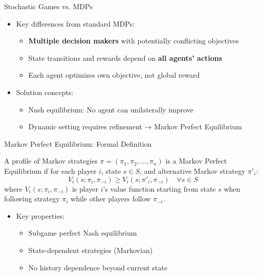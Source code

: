 \documentclass[10pt]{beamer}
\begin{document}
\begin{frame}{Stochastic Games vs. MDPs}
    \begin{itemize}
        \item Key differences from standard MDPs:
        \begin{itemize}
            \item \textbf{Multiple decision makers} with potentially conflicting objectives
            \item State transitions and rewards depend on \textbf{all agents' actions}
            \item Each agent optimizes own objective, not global reward
        \end{itemize}
        \vspace{0.5cm}
        \item Solution concepts:
        \begin{itemize}
            \item Nash equilibrium: No agent can unilaterally improve
            \item Dynamic setting requires refinement → Markov Perfect Equilibrium
        \end{itemize}
    \end{itemize}
\end{frame}


\begin{frame}{Markov Perfect Equilibrium: Formal Definition}
    \begin{definition}
        A profile of Markov strategies $\pi = (\pi_1, \pi_2, \ldots, \pi_n)$ is a Markov Perfect Equilibrium if for each player $i$, state $s \in S$, and alternative Markov strategy $\pi'_i$:
        \begin{equation}
            V_i(s;\pi_i,\pi_{-i}) \geq V_i(s;\pi'_i,\pi_{-i}) \quad \forall s \in S
        \end{equation}
        where $V_i(s;\pi_i,\pi_{-i})$ is player $i$'s value function starting from state $s$ when following strategy $\pi_i$ while other players follow $\pi_{-i}$.
    \end{definition}
    
    \begin{itemize}
        \item Key properties:
        \begin{itemize}
            \item Subgame perfect Nash equilibrium
            \item State-dependent strategies (Markovian)
            \item No history dependence beyond current state
        \end{itemize}
    \end{itemize}
\end{frame}
\end{document}
